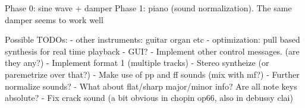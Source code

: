 Phase 0: sine wave + damper
Phase 1: piano (sound normalization). The same damper seems to work well

Possible TODOs:
- other instruments: guitar organ etc
- optimization: pull based synthesis for real time playback
- GUI?
- Implement other control messages. (are they any?)
- Implement format 1 (multiple tracks)
- Stereo syntheize (or paremetrize over that?)
- Make use of pp and ff sounds (mix with mf?)
- Further normalize sounds?
- What about flat/sharp major/minor info? Are all note keys absolute?
- Fix crack sound (a bit obvious in chopin op66, also in debussy clai)
